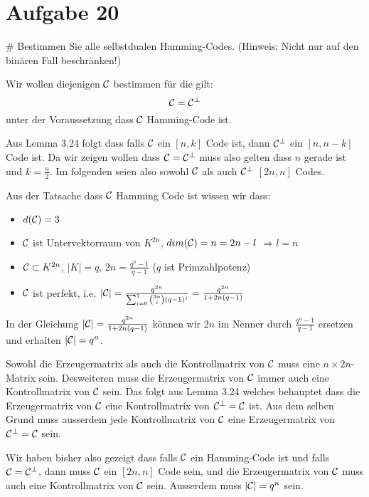 \section*{Aufgabe 20}
\begin{myList}
#
Bestimmen Sie alle selbstdualen Hamming-Codes.
(Hinweis: Nicht nur auf den binären Fall beschränken!)\medskip

Wir wollen diejenigen $\mathcal{C}$ bestimmen für die gilt:
\begin{equation*}
	\mathcal{C} = \mathcal{C}^\bot
\end{equation*}
unter der Voraussetzung dass $\mathcal{C}$ Hamming-Code ist.\medskip

Aus Lemma 3.24 folgt dass falls $\mathcal{C}$ ein $[n,k]$ Code ist, dann $\mathcal{C}^\bot$ ein $[n,n-k]$ Code ist. Da wir zeigen wollen dass $\mathcal{C} = \mathcal{C}^\bot$ muss also gelten dass $n$ gerade ist und $k = \frac{n}{2}$.
Im folgenden seien also sowohl $\mathcal{C}$ als auch $\mathcal{C}^\bot$ $[2n, n]$ Codes.\medskip

Aus der Tatsache dass $\mathcal{C}$ Hamming Code ist wissen wir dass:
\begin{itemize}
	\item $d(\mathcal{C}) = 3$
	\item $\mathcal{C}$ ist Untervektorraum von $K^{2n}$, $dim(\mathcal{C}) = n = 2n - l$ $\Rightarrow l = n$
	\item $\mathcal{C} \subset K^{2n}$, $|K| = q$, $2n = \frac{q^n - 1}{q -1}$ ($q$ ist Primzahlpotenz)
	\item $\mathcal{C}$ ist perfekt, i.e. $|\mathcal{C}| = \frac{q^{2n}}{\sum_{i=0}^1 \binom{2n}{i}(q -1)^i} =  \frac{q^{2n}}{ 1 + 2n(q -1)}$
\end{itemize}\medskip

In der Gleichung $|\mathcal{C}| = \frac{q^{2n}}{1 + 2n(q-1)}$ können wir $2n$ im Nenner durch $\frac{q^n -1}{q-1}$ ersetzen und erhalten $|\mathcal{C}| = q^n$.\medskip

Sowohl die Erzeugermatrix als auch die Kontrollmatrix von $\mathcal{C}$ muss eine $n \times 2n$-Matrix sein.
Desweiteren muss die Erzeugermatrix von $\mathcal{C}$ immer auch eine Kontrollmatrix von $\mathcal{C}$ sein.
Das folgt aus Lemma 3.24 welches behauptet dass die Erzeugermatrix von $\mathcal{C}$ eine Kontrollmatrix von $\mathcal{C}^\bot = \mathcal{C}$ ist. 
Aus dem selben Grund muss ausserdem jede Kontrollmatrix von $\mathcal{C}$ eine Erzeugermatrix von $\mathcal{C}^\bot = \mathcal{C}$ sein.\medskip

Wir haben bisher also gezeigt dass falls $\mathcal{C}$ ein Hamming-Code ist und falls $\mathcal{C} = \mathcal{C}^\bot$, dann muss $\mathcal{C}$ ein $[2n,n]$ Code sein, und die Erzeugermatrix von $\mathcal{C}$ muss auch eine Kontrollmatrix von $\mathcal{C}$ sein. Ausserdem muss $|\mathcal{C}| = q^n$ sein.\medskip


\end{myList}
